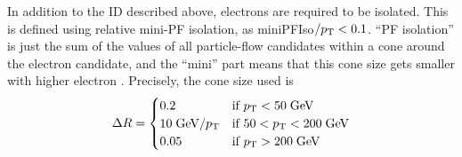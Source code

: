 \begin{table}[htbp]
\caption{Cut-based electron ID for the Veto and Loose ID working points, for electrons in the barrel (endcap).}
\label{tab:electron_id}
\scriptsize
\centering
{}
\end{table}

In addition to the ID described above, electrons are required to be isolated. This is defined using relative
mini-PF isolation, as miniPFIso$/p_{\mathrm{T}}<0.1$. ``PF isolation'' is just the sum of the \pt values of all particle-flow candidates
within a cone around the electron candidate, and the ``mini'' part means that this cone size gets smaller
with higher electron \pt. Precisely, the cone size used is
\begin{equation}
\label{eqn:miniiso}
 \Delta R =
  \begin{cases}
   0.2          & \text{if } p_{\mathrm{T}} < 50\;\text{Ge\hspace{-.08em}V} \\
   10\;\text{Ge\hspace{-.08em}V}/p_{\mathrm{T}}   & \text{if } 50 < p_{\mathrm{T}} < 200\;\text{Ge\hspace{-.08em}V} \\
   0.05         & \text{if } p_{\mathrm{T}} > 200\;\text{Ge\hspace{-.08em}V}
  \end{cases}
\end{equation}

